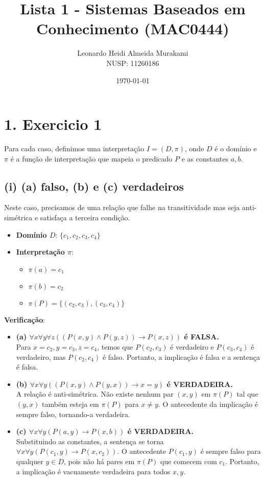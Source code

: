 \documentclass{article}
\title{Lista 1 - Sistemas Baseados em Conhecimento (MAC0444)}
\author{Leonardo Heidi Almeida Murakami \\ NUSP: 11260186}
\date{\today}
\begin{document}
\maketitle

\section*{1. Exercicio 1}
Para cada caso, definimos uma interpretação $I = (D, \pi)$, onde $D$ é o domínio e $\pi$ é a função de interpretação que mapeia o predicado $P$ e as constantes $a, b$.

\subsection*{(i) (a) falso, (b) e (c) verdadeiros}
Neste caso, precisamos de uma relação que falhe na transitividade mas seja anti-simétrica e satisfaça a terceira condição.

\begin{itemize}
    \item \textbf{Domínio $D$}: $\{c_1, c_2, c_3, c_4\}$
    \item \textbf{Interpretação $\pi$}:
    \begin{itemize}
        \item $\pi(a) = c_1$
        \item $\pi(b) = c_2$
        \item $\pi(P) = \{(c_2, c_3), (c_3, c_4)\}$
    \end{itemize}
\end{itemize}

\textbf{Verificação}:
\begin{itemize}
    \item \textbf{(a) $\forall x\forall y\forall z((P(x,y)\wedge P(y,z))\rightarrow P(x,z))$ é FALSA.} \\
    Para $x=c_2, y=c_3, z=c_4$, temos que $P(c_2,c_3)$ é verdadeiro e $P(c_3,c_4)$ é verdadeiro, mas $P(c_2,c_4)$ é falso. Portanto, a implicação é falsa e a sentença é falsa.
    
    \item \textbf{(b) $\forall x\forall y((P(x,y)\wedge P(y,x))\rightarrow x=y)$ é VERDADEIRA.} \\
    A relação é anti-simétrica. Não existe nenhum par $(x,y)$ em $\pi(P)$ tal que $(y,x)$ também esteja em $\pi(P)$ para $x \neq y$. O antecedente da implicação é sempre falso, tornando-a verdadeira.
    
    \item \textbf{(c) $\forall x\forall y(P(a,y)\rightarrow P(x,b))$ é VERDADEIRA.} \\
    Substituindo as constantes, a sentença se torna $\forall x\forall y(P(c_1,y)\rightarrow P(x,c_2))$. O antecedente $P(c_1,y)$ é sempre falso para qualquer $y \in D$, pois não há pares em $\pi(P)$ que comecem com $c_1$. Portanto, a implicação é vacuamente verdadeira para todos $x, y$.
\end{itemize}
\end{document}
